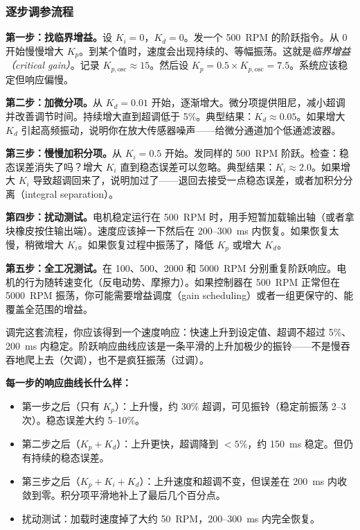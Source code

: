 \subsubsection{逐步调参流程}

\textbf{第一步：找临界增益。}设 $K_i = 0$，$K_d = 0$。发一个 500~RPM 的阶跃指令。从 0 开始慢慢增大 $K_p$。到某个值时，速度会出现持续的、等幅振荡。这就是\textit{临界增益（critical gain）}。记录 $K_{p,\text{osc}} \approx 15$。然后设 $K_p = 0.5 \times K_{p,\text{osc}} = 7.5$。系统应该稳定但响应偏慢。

\textbf{第二步：加微分项。}从 $K_d = 0.01$ 开始，逐渐增大。微分项提供阻尼，减小超调并改善调节时间。持续增大直到超调低于 5\%。典型结果：$K_d \approx 0.05$。如果增大 $K_d$ 引起高频振动，说明你在放大传感器噪声——给微分通道加个低通滤波器。

\textbf{第三步：慢慢加积分项。}从 $K_i = 0.5$ 开始。发同样的 500~RPM 阶跃。检查：稳态误差消失了吗？增大 $K_i$ 直到稳态误差可以忽略。典型结果：$K_i \approx 2.0$。如果增大 $K_i$ 导致超调回来了，说明加过了——退回去接受一点稳态误差，或者加积分分离（integral separation）。

\textbf{第四步：扰动测试。}电机稳定运行在 500~RPM 时，用手短暂加载输出轴（或者拿块橡皮按住输出端）。速度应该掉一下然后在 200--300~ms 内恢复。如果恢复太慢，稍微增大 $K_i$。如果恢复过程中振荡了，降低 $K_p$ 或增大 $K_d$。

\textbf{第五步：全工况测试。}在 100、500、2000 和 5000~RPM 分别重复阶跃响应。电机的行为随转速变化（反电动势、摩擦力）。如果控制器在 500~RPM 正常但在 5000~RPM 振荡，你可能需要增益调度（gain scheduling）或者一组更保守的、能覆盖全范围的增益。

调完这套流程，你应该得到一个速度响应：快速上升到设定值、超调不超过 5\%、200~ms 内稳定。阶跃响应曲线应该是一条平滑的上升加极少的振铃——不是慢吞吞地爬上去（欠调），也不是疯狂振荡（过调）。

\textbf{每一步的响应曲线长什么样：}
\begin{itemize}
    \item 第一步之后（只有 $K_p$）：上升慢，约 30\% 超调，可见振铃（稳定前振荡 2--3 次）。稳态误差大约 5--10\%。
    \item 第二步之后（$K_p + K_d$）：上升更快，超调降到 $<5\%$，约 150~ms 稳定。但仍有持续的稳态误差。
    \item 第三步之后（$K_p + K_i + K_d$）：上升速度和超调不变，但误差在 200~ms 内收敛到零。积分项平滑地补上了最后几个百分点。
    \item 扰动测试：加载时速度掉了大约 50~RPM，200--300~ms 内完全恢复。
\end{itemize}

